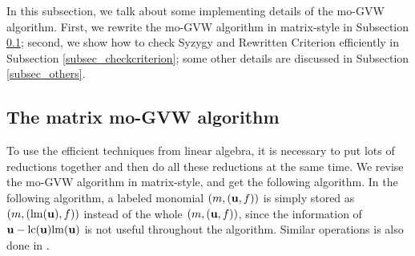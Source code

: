 \documentclass[final, number, 3p,12pt]{elsarticle}
\def\lm{{\rm lm}} %
\def\lc{{\rm lc}}
\def\u{{\bf u}}
\begin{document}
In this subsection, we talk about some implementing details of the mo-GVW algorithm. First, we rewrite the mo-GVW algorithm in matrix-style in Subsection \ref{subsec_matrixmogvw}; second, we show how to check Syzygy and Rewritten Criterion efficiently in Subsection \ref{subsec_checkcriterion}; some other details are discussed in Subsection \ref{subsec_others}.





\subsection{The matrix mo-GVW algorithm} \label{subsec_matrixmogvw}

To use the efficient techniques from linear algebra, it is necessary to put lots of reductions together and then do all these reductions at the same time. We revise the mo-GVW algorithm in matrix-style, and get the following algorithm. In the following algorithm, a labeled monomial $(m, (\u, f))$ is simply stored as $(m, (\lm(\u), f))$ instead of the whole $(m, (\u, f))$, since the information of $\u - \lc(\u)\lm(\u)$ is not useful throughout the algorithm. Similar operations is also done in \citep{Gao10b}.
\end{document}
